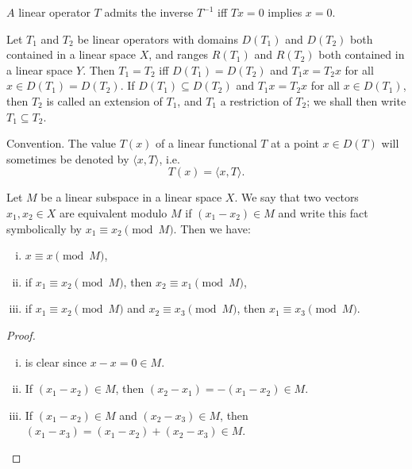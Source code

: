 \begin{propositionu} $A$ linear operator $T$ admits the inverse $T^{-1}$ iff $Tx = 0$ implies $x = 0$. 
\end{propositionu}

\begin{definitionu} Let $T_{1}$ and $T_{2}$ be linear operators with domains $D(T_{1})$ and $D(T_{2})$ both contained in a linear space $X$, and ranges $R(T_{1})$ and $R(T_{2})$ both contained in a linear space $Y$. Then $T_{1} = T_{2}$ iff $D(T_{1}) = D(T_{2})$ and $T_{1}x = T_{2}x$ for all $x \in D(T_{1}) = D(T_{2})$. If $D(T_{1}) \subseteq D(T_{2})$ and $T_{1}x = T_{2}x$ for all $x \in D(T_{1})$, then $T_{2}$ is called an extension of $T_{1}$, and $T_{1}$ a restriction of $T_{2}$; we shall then write $T_{1} \subseteq T_{2}$. 
\end{definitionu}

Convention. The value $T(x)$ of a linear functional $T$ at a point $x \in D(T)$ will sometimes be denoted by $\langle x, T \rangle$, i.e. 
\[
T (x) = \langle x, T \rangle .
\]


\begin{propositionu} Let $M$ be a linear subspace in a linear space $X$. We say that two vectors $x_{1}, x_{2} \in X$ are equivalent modulo $M$ if $(x_{1}- x_{2}) \in M$ and write this fact symbolically by $x_{1} \equiv x_{2} \pmod{M}$. Then we have: 

\begin{enumerate}[(i)]
\item $x \equiv x \pmod{M}$,
\item if $x_{1} \equiv x_{2} \pmod{M}$, then $x_{2} \equiv x_{1} \pmod{M}$,
\item if $x_{1} \equiv x_{2} \pmod{M}$ and $x_{2} \equiv x_{3} \pmod{M}$, then $x_{1} \equiv x_{3} \pmod{M}$.
\end{enumerate}
\end{propositionu}
\begin{proof}
 \begin{enumerate}[(i)]
\item is clear since $x- x = 0 \in M$.
\item If $(x_{1}- x_{2}) \in M$, then $(x_{2}- x_{1}) =-(x_{1}- x_{2}) \in M$.
\item If $(x_{1}- x_{2}) \in M$ and $(x_{2}- x_{3}) \in M$, then $(x_{1}- x_{3}) = (x_{1}- x_{2}) + (x_{2}- x_{3}) \in M$. \qedhere
\end{enumerate}
\end{proof}

